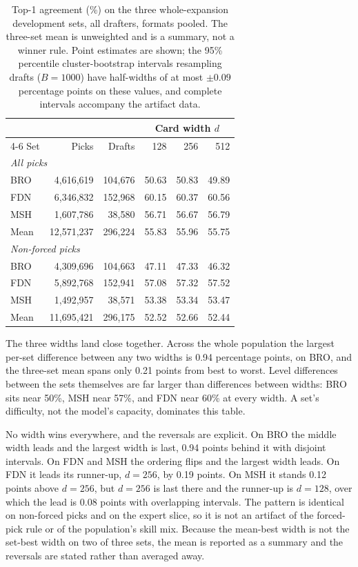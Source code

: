 \documentclass[11pt]{article}
\numberwithin{equation}{section}
\begin{document}
\begin{table}[tb]
\centering
\caption{Top-1 agreement (\%) on the three whole-expansion development sets, all
drafters, formats pooled. The three-set mean is unweighted and is
a summary, not a winner rule. Point estimates are shown; the 95\% percentile
cluster-bootstrap intervals resampling drafts ($B=1000$) have half-widths of at
most $\pm0.09$ percentage points on these values, and complete intervals
accompany the artifact data.}
\label{tab:width-top1}
{\small
\setlength{\tabcolsep}{8pt}
\begin{tabular}{lrrrrr}
\toprule
& & & \multicolumn{3}{c}{Card width $d$} \\
\cmidrule(lr){4-6}
Set & Picks & Drafts & 128 & 256 & 512 \\
\midrule
\multicolumn{6}{l}{\emph{All picks}} \\
BRO & 4,616,619 & 104,676 & 50.63 & 50.83 & 49.89 \\
FDN & 6,346,832 & 152,968 & 60.15 & 60.37 & 60.56 \\
MSH & 1,607,786 & 38,580 & 56.71 & 56.67 & 56.79 \\
\addlinespace
Mean & 12,571,237 & 296,224 & 55.83 & 55.96 & 55.75 \\
\midrule
\multicolumn{6}{l}{\emph{Non-forced picks}} \\
BRO & 4,309,696 & 104,663 & 47.11 & 47.33 & 46.32 \\
FDN & 5,892,768 & 152,941 & 57.08 & 57.32 & 57.52 \\
MSH & 1,492,957 & 38,571 & 53.38 & 53.34 & 53.47 \\
\addlinespace
Mean & 11,695,421 & 296,175 & 52.52 & 52.66 & 52.44 \\
\bottomrule
\end{tabular}
}
\end{table}

The three widths land close together. Across the whole population the largest
per-set difference between any two widths is 0.94 percentage points, on BRO, and
the three-set mean spans only 0.21 points from best to worst. Level differences
between the sets themselves are far larger than differences between widths: BRO
sits near 50\%, MSH near 57\%, and FDN near 60\% at every width. A set's
difficulty, not the model's capacity, dominates this table.

No width wins everywhere, and the reversals are explicit. On BRO the middle
width leads and the largest width is last, 0.94 points behind it with disjoint
intervals. On FDN and MSH the ordering flips and the largest width leads. On FDN
it leads its runner-up, $d=256$, by 0.19 points. On MSH it stands 0.12 points
above $d=256$, but $d=256$ is last there and the runner-up is $d=128$, over
which the lead is 0.08 points with overlapping intervals. The pattern is
identical on non-forced picks
and on the expert slice, so it is not an artifact of the forced-pick rule or of
the population's skill mix. Because the mean-best width is not the set-best
width on two of three sets, the mean is reported as a summary and the reversals
are stated rather than averaged away.
\end{document}

